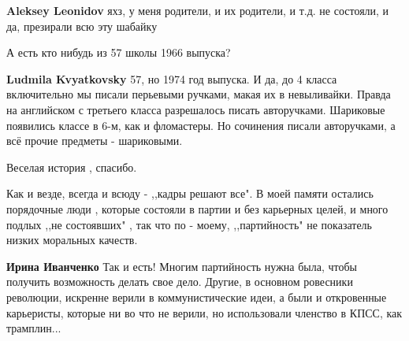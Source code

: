 \begin{itemize}
\begin{itemize}
\begin{itemize}
\textbf{Aleksey Leonidov} яхз, у меня родители, и их родители, и т.д. не состояли, и да, презирали всю эту шабайку
\end{itemize}

\end{itemize}

 
А есть кто нибудь из 57 школы 1966 выпуска?

\begin{itemize}
 
\textbf{Ludmila Kvyatkovsky} 57, но 1974 год выпуска. И да, до 4 класса
включительно мы писали перьевыми ручками, макая их в невыливайки. Правда на
английском с третьего класса разрешалось писать авторучками. Шариковые
появились классе в 6-м, как и фломастеры. Но сочинения писали авторучками, а
всё прочие предметы - шариковыми.
\end{itemize}

 

Веселая история , спасибо.

Как и везде, всегда и всюду - ,,кадры решают все". В моей памяти остались
порядочные люди , которые состояли в партии и без карьерных целей, и много
подлых ,,не состоявших" , так что по - моему, ,,партийность" не показатель
низких моральных качеств.

\begin{itemize}
 
\textbf{Ирина Иванченко} Так и есть! Многим партийность нужна была, чтобы
получить возможность делать свое дело. Другие, в основном ровесники революции,
искренне верили в коммунистические идеи, а были и откровенные карьеристы,
которые ни во что не верили, но использовали членство в КПСС, как трамплин...
\end{itemize}


\end{itemize}
